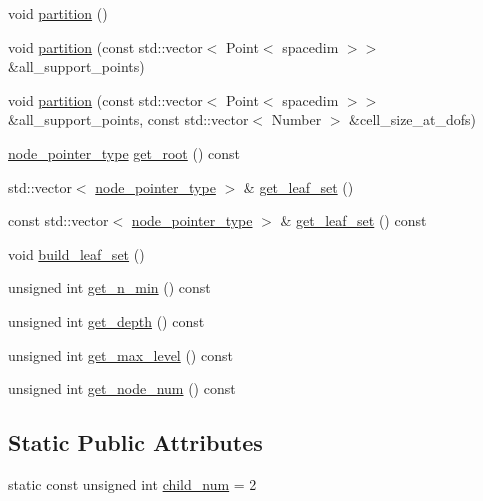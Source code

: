 \begin{DoxyCompactItemize}
void \hyperlink{classClusterTree_aa514c3b75864d5f7be72315a30079cfe}{partition} ()
\item 
void \hyperlink{classClusterTree_a5657415b4b0519f045f3139d1d63e85d}{partition} (const std\+::vector$<$ Point$<$ spacedim $>$$>$ \&all\+\_\+support\+\_\+points)
\item 
void \hyperlink{classClusterTree_a4d2682986352bb1e44bc73ebfc5a9fdf}{partition} (const std\+::vector$<$ Point$<$ spacedim $>$$>$ \&all\+\_\+support\+\_\+points, const std\+::vector$<$ Number $>$ \&cell\+\_\+size\+\_\+at\+\_\+dofs)
\item 
\hyperlink{classClusterTree_ae4bb0fdc7ac559d7844d04a00ab3e9de}{node\+\_\+pointer\+\_\+type} \hyperlink{classClusterTree_a13132bfc3ca8b70af8c80066565b0adb}{get\+\_\+root} () const
\item 
std\+::vector$<$ \hyperlink{classClusterTree_ae4bb0fdc7ac559d7844d04a00ab3e9de}{node\+\_\+pointer\+\_\+type} $>$ \& \hyperlink{classClusterTree_af17a96da7f2e5391d3e49028b2aba894}{get\+\_\+leaf\+\_\+set} ()
\item 
const std\+::vector$<$ \hyperlink{classClusterTree_ae4bb0fdc7ac559d7844d04a00ab3e9de}{node\+\_\+pointer\+\_\+type} $>$ \& \hyperlink{classClusterTree_afbf8f03d5f34305d3c34ae4c360f50ae}{get\+\_\+leaf\+\_\+set} () const
\item 
void \hyperlink{classClusterTree_a1e7dc037d01b3e15f1d6b4eacac59cb1}{build\+\_\+leaf\+\_\+set} ()
\item 
unsigned int \hyperlink{classClusterTree_a403e59575a89a3e86e8d7092a8815aa5}{get\+\_\+n\+\_\+min} () const
\item 
unsigned int \hyperlink{classClusterTree_a2bd8dd175c4459338d76a8cb879afccf}{get\+\_\+depth} () const
\item 
unsigned int \hyperlink{classClusterTree_a3c1125039b1915ebad94247d6888df31}{get\+\_\+max\+\_\+level} () const
\item 
unsigned int \hyperlink{classClusterTree_af80051449b7324121fb0a27d5ce7c9a1}{get\+\_\+node\+\_\+num} () const
\end{DoxyCompactItemize}
\subsection*{Static Public Attributes}
\begin{DoxyCompactItemize}
\item 
static const unsigned int \hyperlink{classClusterTree_aa9705d3fecd5b405b804331ea031570c}{child\+\_\+num} = 2
\end{DoxyCompactItemize}
